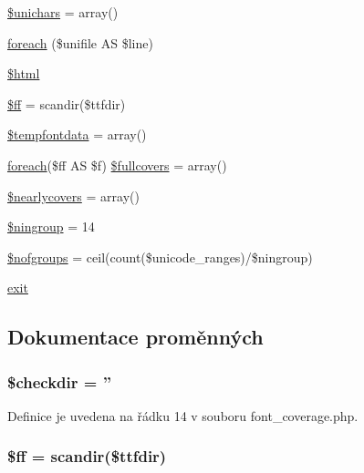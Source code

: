 \begin{DoxyCompactItemize}
\hyperlink{font__coverage_8php_ab216a6d320faf1beba59f97c9941d866}{\$unichars} = array()
\item 
\hyperlink{font__coverage_8php_afa3e0d7f4c07331bb8ee7bd7e2008de6}{foreach} (\$unifile A\-S \$line)
\item 
\hyperlink{font__coverage_8php_adaf3754f65c4619ab65aa55169ef684e}{\$html}
\item 
\hyperlink{font__coverage_8php_a064fd64c462dd929cd17812cf14ec09e}{\$ff} = scandir(\$ttfdir)
\item 
\hyperlink{font__coverage_8php_a47be5bc20842a7025769908c5470c016}{\$tempfontdata} = array()
\item 
\hyperlink{font__names_8php_ac6e05d8eea8274a71f8f9c686e891421}{foreach}(\$ff A\-S \$f) \hyperlink{font__coverage_8php_a21ad601587a1620504b68ce5258b9ff6}{\$fullcovers} = array()
\item 
\hyperlink{font__coverage_8php_ade6f9afa46985ab699e0e5c9ca964210}{\$nearlycovers} = array()
\item 
\hyperlink{font__coverage_8php_af1f5707cce79ac65e657d1c0528d63a6}{\$ningroup} = 14
\item 
\hyperlink{font__coverage_8php_a24671fbe97d92adec47bb01f3c5b389b}{\$nofgroups} = ceil(count(\$unicode\-\_\-ranges)/\$ningroup)
\item 
\hyperlink{font__coverage_8php_a6733eb5f605d09eaede9845835d71c4e}{exit}
\end{DoxyCompactItemize}


\subsection{Dokumentace proměnných}
\hypertarget{font__coverage_8php_ad773ebf7841c6538baa63f9945d7c9ca}{
\subsubsection[{\$checkdir}]{\setlength{\rightskip}{0pt plus 5cm}\$checkdir = ''}}\label{font__coverage_8php_ad773ebf7841c6538baa63f9945d7c9ca}


Definice je uvedena na řádku 14 v souboru font\-\_\-coverage.\-php.

\hypertarget{font__coverage_8php_a064fd64c462dd929cd17812cf14ec09e}{
\subsubsection[{\$ff}]{\setlength{\rightskip}{0pt plus 5cm}\$ff = scandir(\$ttfdir)}}\label{font__coverage_8php_a064fd64c462dd929cd17812cf14ec09e}


